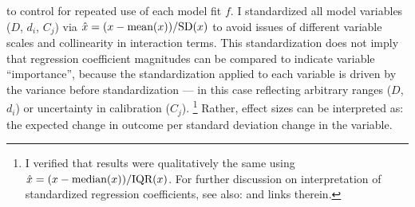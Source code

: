 to control for repeated use of each model fit $f$.
I standardized all model variables ($D$, $d_i$, $C_j$) via
$\hat{x} = (x - \textnormal{mean}(x)) / \textnormal{SD}(x)$
to avoid issues of different variable scales and collinearity in interaction terms.
This standardization does not imply that
regression coefficient magnitudes can be compared to indicate variable ``importance'',
because the standardization applied to each variable is driven
by the variance before standardization
--- in this case reflecting arbitrary ranges ($D$, $d_i$) or uncertainty in calibration ($C_j$).%
\footnote{I verified that results were qualitatively the same using
  $\hat{x} = (x - \textnormal{median}(x)) / \textnormal{IQR}(x)$.
  For further discussion on interpretation of standardized regression coefficients,
  see also:  and links therein.}
Rather, effect sizes can be interpreted as:
the expected change in outcome per standard deviation change in the variable.
